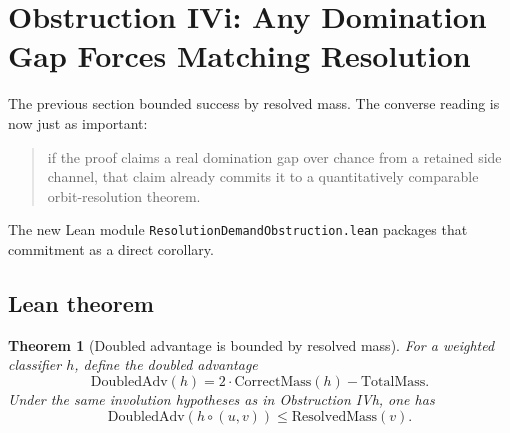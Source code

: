 \documentclass[11pt]{article}
\newtheorem{theorem}{Theorem}[section]
\theoremstyle{remark}
\begin{document}
\section{Obstruction IVi: Any Domination Gap Forces Matching Resolution}

The previous section bounded success by resolved mass.  The converse reading is now just as
important:
\begin{quote}
if the proof claims a real domination gap over chance from a retained side channel, that claim
already commits it to a quantitatively comparable orbit-resolution theorem.
\end{quote}

The new Lean module \texttt{ResolutionDemandObstruction.lean} packages that commitment as a direct
corollary.

\subsection{Lean theorem}

\begin{theorem}[Doubled advantage is bounded by resolved mass]
For a weighted classifier \(h\), define the \emph{doubled advantage}
\[
  \mathrm{DoubledAdv}(h)
  =
  2 \cdot \mathrm{CorrectMass}(h) - \mathrm{TotalMass}.
\]
Under the same involution hypotheses as in Obstruction IVh, one has
\[
  \mathrm{DoubledAdv}(h \circ (u,v))
  \le
  \mathrm{ResolvedMass}(v).
\]
\end{theorem}
\end{document}
